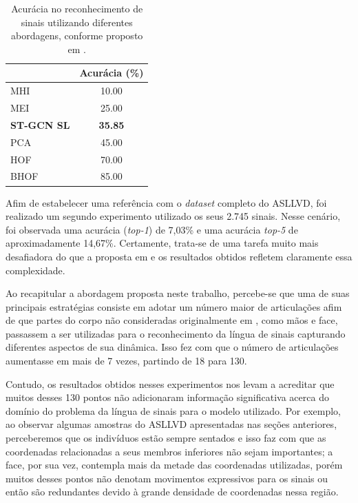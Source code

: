 \begin{table}[ht]
\centering
\caption{Acurácia no reconhecimento de sinais utilizando diferentes abordagens, conforme proposto em \cite{lim-2016}.}
\label{tab:results-comparison-20}
\begin{tabular}{lc}
\hline
                   & Acurácia (\%)  \\ \hline
MHI                & 10.00                     \\
MEI                & 25.00                     \\
\textbf{ST-GCN SL} & \textbf{35.85}            \\
PCA                & 45.00                     \\
HOF                & 70.00                     \\
BHOF               & 85.00                     \\ \hline
\end{tabular}
\end{table}



Afim de estabelecer uma referência com o \textit{dataset} completo do ASLLVD, foi realizado um segundo experimento utilizado os seus 2.745 sinais. Nesse cenário, foi observada uma acurácia (\textit{top-1}) de 7,03\% e uma acurácia \textit{top-5} de aproximadamente 14,67\%. Certamente, trata-se de uma tarefa muito mais desafiadora do que a proposta em \cite{lim-2016} e os resultados obtidos refletem claramente essa complexidade. 



Ao recapitular a abordagem proposta neste trabalho, percebe-se que uma de suas principais estratégias consiste em adotar um número maior de articulações afim de que partes do corpo não consideradas originalmente em \cite{st-gcn-2018}, como mãos e face, passassem a ser utilizadas para o reconhecimento da língua de sinais capturando diferentes aspectos de sua dinâmica. Isso fez com que o número de articulações aumentasse em mais de 7 vezes, partindo de 18 para 130. 

Contudo, os resultados obtidos nesses experimentos nos levam a acreditar que muitos desses 130 pontos não adicionaram informação significativa acerca do domínio do problema da língua de sinais para o modelo utilizado. Por exemplo, ao observar algumas amostras do ASLLVD apresentadas nas seções anteriores, perceberemos que os indivíduos estão sempre sentados e isso faz com que as coordenadas relacionadas a seus membros inferiores não sejam importantes; a face, por sua vez, contempla mais da metade das coordenadas utilizadas, porém muitos desses pontos não denotam movimentos expressivos para os sinais ou então são redundantes devido à grande densidade de coordenadas nessa região. 

